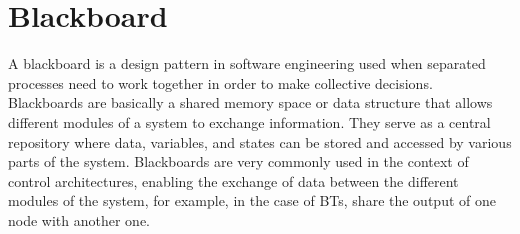 \section{Blackboard}

A blackboard \cite{BlackboardDesignPattern} is a design pattern in software engineering used when separated processes need to work together in order to make collective decisions. Blackboards are basically a shared memory space or data structure that allows different modules of a system to exchange information. They serve as a central repository where data, variables, and states can be stored and accessed by various parts of the system. Blackboards are very commonly used in the context of control architectures, enabling the exchange of data between the different modules of the system, for example, in the case of BTs, share the output of one node with another one.
